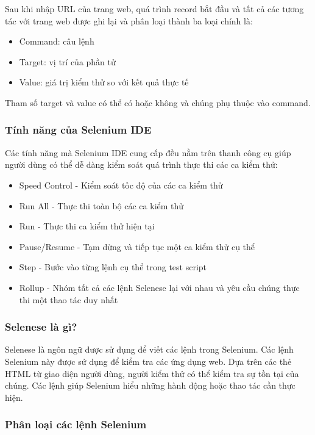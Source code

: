 \documentclass[./../main_file.tex]{subfiles}
\begin{document}
	Sau khi nhập URL của trang web, quá trình record bắt đầu và tất cả các tương tác với trang web được ghi lại và phân loại thành ba loại chính là:
	
	\begin{itemize}
		\item Command: câu lệnh
		\item Target: vị trí của phần tử
		\item Value: giá trị kiểm thử so với kết quả thực tế
	\end{itemize}

	Tham số target và value có thể có hoặc không và chúng phụ thuộc vào command.
	
	\subsubsection{Tính năng của Selenium IDE}
	
	Các tính năng mà Selenium IDE cung cấp đều nằm trên thanh công cụ giúp người dùng có thể dễ dàng kiểm soát quá trình thực thi các ca kiểm thử:
	
	\begin{itemize}
		\item Speed Control - Kiểm soát tốc độ của các ca kiểm thử
		\item Run All - Thực thi toàn bộ các ca kiểm thử
		\item Run - Thực thi ca kiểm thử hiện tại
		\item Pause/Resume - Tạm dừng và tiếp tục một ca kiểm thử cụ thể
		\item Step - Bước vào từng lệnh cụ thể trong test script
		\item Rollup - Nhóm tất cả các lệnh Selenese lại với nhau và yêu cầu chúng thực thi một thao tác duy nhất
	\end{itemize}

	\subsubsection{Selenese là gì?}
	
	Selenese là ngôn ngữ được sử dụng để viết các lệnh trong Selenium. Các lệnh Selenium này được sử dụng để kiểm tra các ứng dụng web. Dựa trên các thẻ HTML từ giao diện người dùng, người kiểm thử có thể kiểm tra sự tồn tại của chúng. Các lệnh giúp Selenium hiểu những hành động hoặc thao tác cần thực hiện.
	
	\subsubsection{Phân loại các lệnh Selenium}
	
\end{document}
